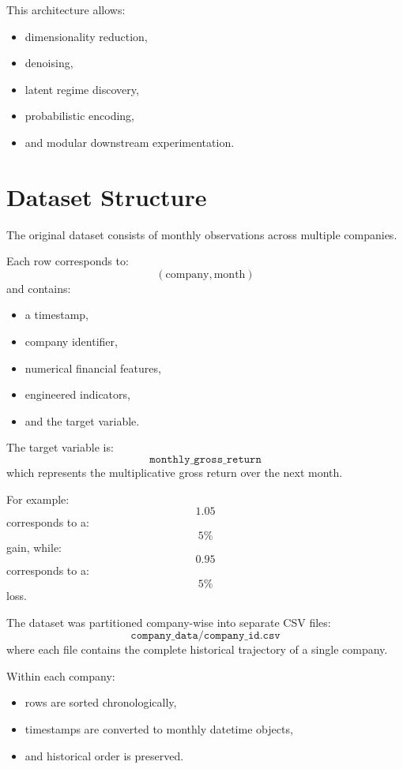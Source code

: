 \documentclass[11pt]{article}
\begin{document}
This architecture allows:
\begin{itemize}
    \item dimensionality reduction,
    \item denoising,
    \item latent regime discovery,
    \item probabilistic encoding,
    \item and modular downstream experimentation.
\end{itemize}

\section{Dataset Structure}

The original dataset consists of monthly observations across multiple companies.

Each row corresponds to:
\[
(\text{company}, \text{month})
\]
and contains:
\begin{itemize}
    \item a timestamp,
    \item company identifier,
    \item numerical financial features,
    \item engineered indicators,
    \item and the target variable.
\end{itemize}

The target variable is:
\[
\texttt{monthly\_gross\_return}
\]
which represents the multiplicative gross return over the next month.

For example:
\[
1.05
\]
corresponds to a:
\[
5\%
\]
gain, while:
\[
0.95
\]
corresponds to a:
\[
5\%
\]
loss.

The dataset was partitioned company-wise into separate CSV files:
\[
\texttt{company\_data/company\_id.csv}
\]
where each file contains the complete historical trajectory of a single company.

Within each company:
\begin{itemize}
    \item rows are sorted chronologically,
    \item timestamps are converted to monthly datetime objects,
    \item and historical order is preserved.
\end{itemize}
\end{document}

